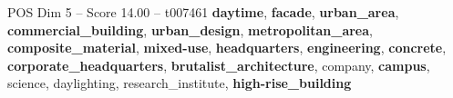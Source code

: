 \begin{textsample}{POS Dim 5 – Score 14.00 – t007461}  \label{ex:f5_pos_039}
\textbf{daytime}, \textbf{facade}, \textbf{urban\_area}, \textbf{commercial\_building}, \textbf{urban\_design}, \textbf{metropolitan\_area}, \textbf{composite\_material}, \textbf{mixed-use}, \textbf{headquarters}, \textbf{engineering}, \textbf{concrete}, \textbf{corporate\_headquarters}, \textbf{brutalist\_architecture}, company, \textbf{campus}, science, daylighting, research\_institute, \textbf{high-rise\_building}

\end{textsample}

